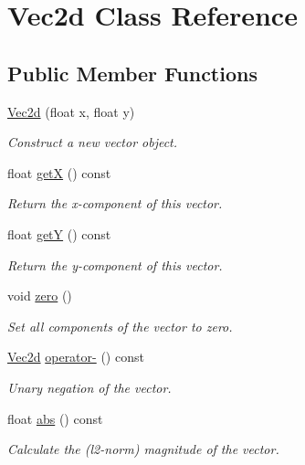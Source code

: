 \hypertarget{classVec2d}{}\section{Vec2d Class Reference}
\label{classVec2d}
\subsection*{Public Member Functions}
\begin{DoxyCompactItemize}
\item 
\hyperlink{classVec2d_ae8a66a4b213a87a0baf92e818aca443e}{Vec2d} (float x, float y)
\begin{DoxyCompactList}\small\item\em Construct a new vector object. \end{DoxyCompactList}\item 
float \hyperlink{classVec2d_a20c3d6a967bebbd21690da5b29baa7df}{getX} () const
\begin{DoxyCompactList}\small\item\em Return the x-\/component of this vector. \end{DoxyCompactList}\item 
float \hyperlink{classVec2d_a9c3408a01420fdd3fe9011810203dc7b}{getY} () const
\begin{DoxyCompactList}\small\item\em Return the y-\/component of this vector. \end{DoxyCompactList}\item 
\mbox{\label{classVec2d_a7459ae1cabaa95a9b52b518a89c8a763}} 
void \hyperlink{classVec2d_a7459ae1cabaa95a9b52b518a89c8a763}{zero} ()
\begin{DoxyCompactList}\small\item\em Set all components of the vector to zero. \end{DoxyCompactList}\item 
\hyperlink{classVec2d}{Vec2d} \hyperlink{classVec2d_a1e010b36566dfc5962ef7fe4c812347d}{operator-\/} () const
\begin{DoxyCompactList}\small\item\em Unary negation of the vector. \end{DoxyCompactList}\item 
float \hyperlink{classVec2d_ad0274969d040d25e35fe25759b32181f}{abs} () const
\begin{DoxyCompactList}\small\item\em Calculate the (l2-\/norm) magnitude of the vector. \end{DoxyCompactList}\item 

\end{DoxyCompactItemize}
